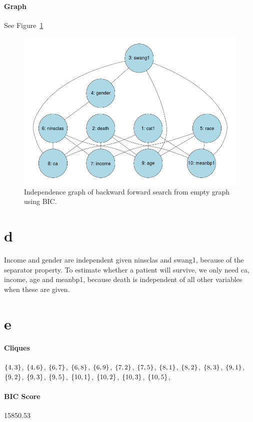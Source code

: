 \documentclass[12pt]{article}
\theoremstyle{definition}
\begin{document}
\paragraph{Graph} See Figure~\ref{fig:c}

\begin{figure}[H]
    \centering
    \includegraphics[width=0.8\linewidth]{c.png}
    \caption{Independence graph of backward forward search from empty graph using BIC.}
\label{fig:c}
\end{figure}

\section*{d}
Income and gender are independent given ninsclas and swang1, because of the separator property.
To estimate whether a patient will survive, we only need ca, income, age and meanbp1, because
death is independent of all other variables when these are given.

\section*{e}
\paragraph{Cliques}
$\set{4,3}$, $\set{4,6}$, $\set{6,7}$, $\set{6,8}$, $\set{6,9}$, $\set{7,2}$, $\set{7,5}$,
$\set{8,1}$, $\set{8,2}$, $\set{8,3}$, $\set{9,1}$, $\set{9,2}$, $\set{9,3}$, $\set{9,5}$,
$\set{10,1}$, $\set{10,2}$, $\set{10,3}$, $\set{10,5}$,

\paragraph{BIC Score} 15850.53
\end{document}
